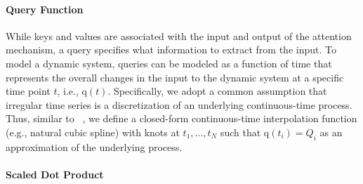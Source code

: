 \documentclass{article}
\begin{document}
\paragraph{Query Function} \label{ms:q}

While keys and values are associated with the input and output of the attention mechanism, a query specifies what information to extract from the input. 
To model a dynamic system, queries can be modeled as a function of time that represents the overall changes in the input to the dynamic system at a specific time point $t$, i.e., $\boldsymbol{\mathrm{q}}(t)$. 
Specifically, we adopt a common assumption that irregular time series is a discretization of an underlying continuous-time process. 
Thus, similar to ~\cite{kidger2020neural}, we define a closed-form continuous-time interpolation function (e.g., natural cubic spline) with knots at $t_1, \ldots, t_N$ such that $\boldsymbol{\mathrm{q}}(t_i) = Q_i$ as an approximation of the underlying process. 

\paragraph{Scaled Dot Product}
\end{document}
